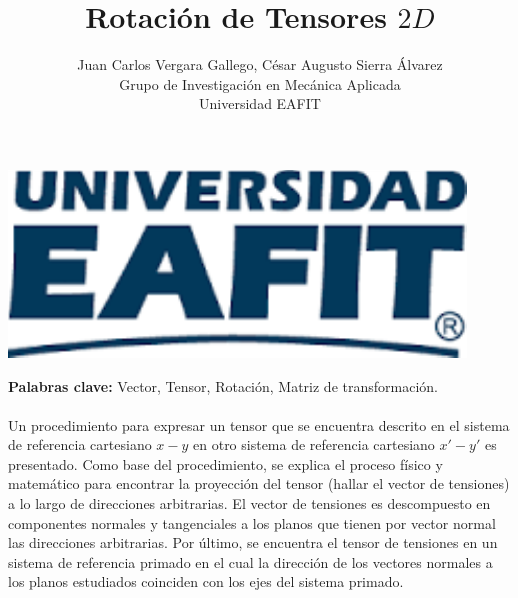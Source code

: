 \documentclass[12pt,letterpaper, twoside, openany]{article}
\author{Juan Carlos Vergara Gallego, César Augusto Sierra Álvarez\\
Grupo de Investigación en Mecánica Aplicada \\ Universidad EAFIT}
\title{\textbf{Rotación de Tensores $2D$}}
\begin{document}
\pagestyle{fancyplain}
\fancyhf{}
\headheight=20pt %
\renewcommand{\headrulewidth}{0pt} %

\lhead %
{
\begin{minipage}{3cm}
\includegraphics[width=1.5 in]{img/logo.pdf}
\end{minipage}
}

\fancyfoot[c]{\thepage}

\maketitle


{\bf Palabras clave:} Vector, Tensor, Rotación, Matriz de transformación.\\\\

\abstract
%
Un procedimiento para expresar un tensor que se encuentra descrito en el sistema de referencia cartesiano $x-y$ en otro sistema de referencia cartesiano $x'-y'$ es presentado. Como base del procedimiento, se explica el proceso físico y matemático para encontrar la proyección del tensor (hallar el vector de tensiones) a lo largo de direcciones arbitrarias. El vector de tensiones es descompuesto en componentes normales y tangenciales a los planos que tienen por vector normal las direcciones arbitrarias. Por último, se encuentra el tensor de tensiones en un sistema de referencia primado en el cual la dirección de los vectores normales a los planos estudiados coinciden con los ejes del sistema primado.
%
\end{document}
